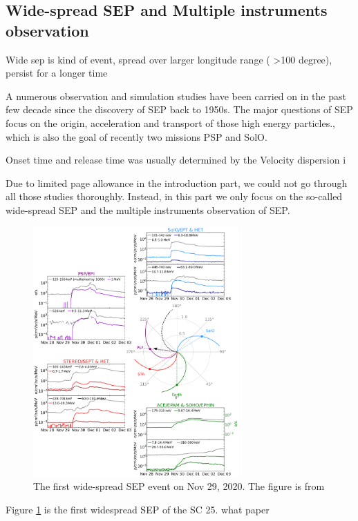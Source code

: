 \subsection{Wide-spread SEP and Multiple instruments observation}

Wide sep is kind of event, spread over larger longitude range ( >100 degree), persist for a longer time

A numerous observation and simulation studies have been carried on in the past few decade since the discovery of SEP back to 1950s. The major questions of SEP focus on the origin, acceleration and transport of those high energy particles.\cite{Desai2016_review}, which is also the goal of recently two missions \ac{PSP} and \ac{SolO}. 

Onset time and release time was usually determined by the Velocity dispersion i

Due to limited page allowance in the introduction part, we could not go through all those studies thoroughly. Instead, in this part we only focus on the so-called wide-spread SEP and the multiple instruments observation of SEP.
\begin{figure}
	\centering
	\includegraphics[width = 0.7\textwidth]{images/2020-11-29_overview_plot.png}
	\caption{The first wide-spread \acl{SEP} event on Nov 29, 2020. The figure is from \citep{Kollhoff-2021}}
	\label{Fig:SEP_widespread}
\end{figure}

Figure \ref{Fig:SEP_widespread} is the first widespread SEP of the SC 25. what paper

